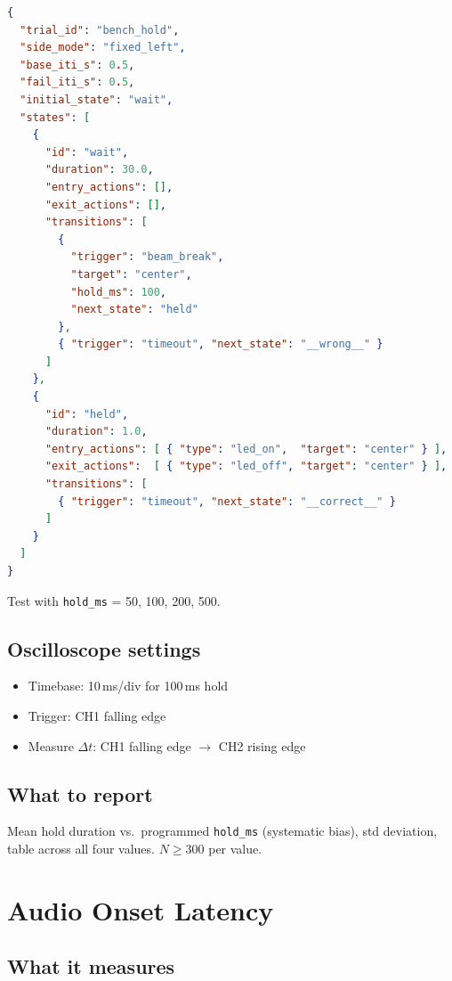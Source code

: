 \documentclass[11pt, a4paper]{article}
\begin{document}
\begin{lstlisting}[language=json]
{
  "trial_id": "bench_hold",
  "side_mode": "fixed_left",
  "base_iti_s": 0.5,
  "fail_iti_s": 0.5,
  "initial_state": "wait",
  "states": [
    {
      "id": "wait",
      "duration": 30.0,
      "entry_actions": [],
      "exit_actions": [],
      "transitions": [
        {
          "trigger": "beam_break",
          "target": "center",
          "hold_ms": 100,
          "next_state": "held"
        },
        { "trigger": "timeout", "next_state": "__wrong__" }
      ]
    },
    {
      "id": "held",
      "duration": 1.0,
      "entry_actions": [ { "type": "led_on",  "target": "center" } ],
      "exit_actions":  [ { "type": "led_off", "target": "center" } ],
      "transitions": [
        { "trigger": "timeout", "next_state": "__correct__" }
      ]
    }
  ]
}
\end{lstlisting}

Test with \texttt{hold\_ms} = 50, 100, 200, 500.

\subsection*{Oscilloscope settings}

\begin{itemize}[noitemsep]
    \item Timebase: 10\,ms/div for 100\,ms hold
    \item Trigger: CH1 falling edge
    \item Measure $\Delta t$: CH1 falling edge $\rightarrow$ CH2 rising edge
\end{itemize}

\subsection*{What to report}

Mean hold duration vs.\ programmed \texttt{hold\_ms} (systematic bias),
std deviation, table across all four values. $N \geq 300$ per value.

\newpage

\section{Audio Onset Latency}

\subsection*{What it measures}
\end{document}
